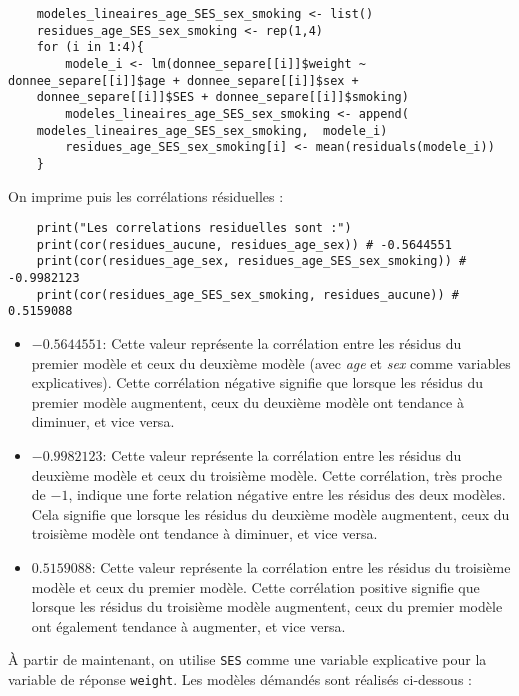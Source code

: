 \documentclass[../main.tex]{subfiles}
\begin{document}
\begin{CJK*}{UTF8}{gbsn}
\begin{enumerate}
\begin{lstlisting}
    modeles_lineaires_age_SES_sex_smoking <- list()
    residues_age_SES_sex_smoking <- rep(1,4)
    for (i in 1:4){
        modele_i <- lm(donnee_separe[[i]]$weight ~ donnee_separe[[i]]$age + donnee_separe[[i]]$sex + 
    donnee_separe[[i]]$SES + donnee_separe[[i]]$smoking)
        modeles_lineaires_age_SES_sex_smoking <- append(
    modeles_lineaires_age_SES_sex_smoking,  modele_i)
        residues_age_SES_sex_smoking[i] <- mean(residuals(modele_i))
    }
    \end{lstlisting}   
\end{enumerate}

On imprime puis les corrélations résiduelles :

\begin{lstlisting}
    print("Les correlations residuelles sont :")
    print(cor(residues_aucune, residues_age_sex)) # -0.5644551
    print(cor(residues_age_sex, residues_age_SES_sex_smoking)) # -0.9982123
    print(cor(residues_age_SES_sex_smoking, residues_aucune)) # 0.5159088
\end{lstlisting}

\begin{itemize}
    \item \(-0.5644551\): 
Cette valeur représente la corrélation entre les résidus du premier modèle  et ceux du deuxième modèle 
(avec \textit{age} et \textit{sex} comme variables explicatives). 
Cette corrélation négative signifie que lorsque les résidus du premier modèle augmentent, 
ceux du deuxième modèle ont tendance à diminuer, et vice versa.
    
    \item \(-0.9982123\): 
Cette valeur représente la corrélation entre les résidus du deuxième modèle et 
ceux du troisième modèle. Cette corrélation, très proche de $-1$, 
indique une forte relation négative entre les résidus des deux modèles. 
Cela signifie que lorsque les résidus du deuxième modèle augmentent, 
ceux du troisième modèle ont tendance à diminuer, et vice versa.
    
    \item \(0.5159088\): 
Cette valeur représente la corrélation entre les résidus du troisième modèle et ceux du premier modèle. 
Cette corrélation positive signifie que lorsque les résidus du troisième modèle augmentent, 
ceux du premier modèle ont également tendance à augmenter, et vice versa.
\end{itemize}
   
À partir de maintenant, on utilise \texttt{SES} comme une variable explicative pour la variable de réponse \texttt{weight}.
Les modèles démandés sont réalisés ci-dessous :


\end{CJK*}
\end{document}
